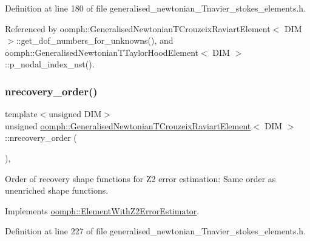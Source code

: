 Definition at line 180 of file generalised\+\_\+newtonian\+\_\+\+Tnavier\+\_\+stokes\+\_\+elements.\+h.



Referenced by oomph\+::\+Generalised\+Newtonian\+T\+Crouzeix\+Raviart\+Element$<$ D\+I\+M $>$\+::get\+\_\+dof\+\_\+numbers\+\_\+for\+\_\+unknowns(), and oomph\+::\+Generalised\+Newtonian\+T\+Taylor\+Hood\+Element$<$ D\+I\+M $>$\+::p\+\_\+nodal\+\_\+index\+\_\+nst().

\mbox{\label{classoomph_1_1GeneralisedNewtonianTCrouzeixRaviartElement_aea98b68015a21595aafda3f4a2ef6cba}} 
\subsubsection{\texorpdfstring{nrecovery\+\_\+order()}{nrecovery\_order()}}
{\footnotesize\ttfamily template$<$unsigned D\+IM$>$ \\
unsigned \hyperlink{classoomph_1_1GeneralisedNewtonianTCrouzeixRaviartElement}{oomph\+::\+Generalised\+Newtonian\+T\+Crouzeix\+Raviart\+Element}$<$ D\+IM $>$\+::nrecovery\+\_\+order (\begin{DoxyParamCaption}{ }\end{DoxyParamCaption})\hspace{0.3cm}{\ttfamily [inline]}, {\ttfamily [virtual]}}



Order of recovery shape functions for Z2 error estimation\+: Same order as unenriched shape functions. 



Implements \hyperlink{classoomph_1_1ElementWithZ2ErrorEstimator_af39480835bd3e0f6b2f4f7a9a4044798}{oomph\+::\+Element\+With\+Z2\+Error\+Estimator}.



Definition at line 227 of file generalised\+\_\+newtonian\+\_\+\+Tnavier\+\_\+stokes\+\_\+elements.\+h.

\mbox{\label{classoomph_1_1GeneralisedNewtonianTCrouzeixRaviartElement_a436beb40886487adb54a70d4ce24ac2f}} 
